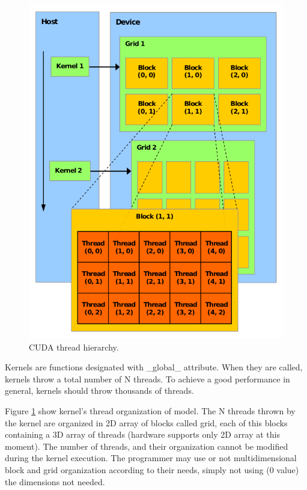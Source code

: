 \documentclass[thesis=M,english]{FITthesis}[2011/07/15]
\begin{document}
\begin{figure}[h]
\centering
\includegraphics[scale=0.45]{images/cuda_threads.png}
\caption{CUDA thread hierarchy.}
\label{fig:cuda_threads}
\end{figure}

Kernels are functions designated with \_global\_ attribute. When they are called, kernels throw a total number of N threads. To achieve a good performance in general, kernels should throw thousands of threads. 

Figure \ref{fig:cuda_threads} show kernel’s thread organization of model. The N threads thrown by the kernel are organized in 2D array of blocks called grid, each of this blocks containing a 3D array of threads (hardware supports only 2D array at this moment). The number of threads, and their organization cannot be modified during the kernel execution. The programmer may use or not multidimensional block and grid organization according to their needs, simply not using (0 value) the dimensions not needed. 
\end{document}
